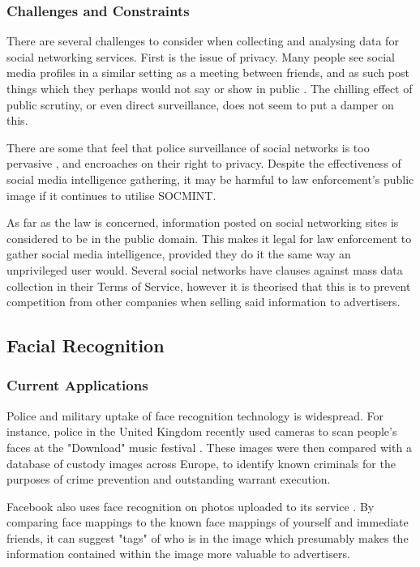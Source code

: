\documentclass{article}
\begin{document}
\subsubsection{Challenges and Constraints}
There are several challenges to consider when collecting and analysing data for social networking services. First is the issue of privacy. Many people see social media profiles in a similar setting as a meeting between friends, and as such post things which they perhaps would not say or show in public \citep{socialmediacontent}. The chilling effect of public scrutiny, or even direct surveillance, does not seem to put a damper on this.

There are some that feel that police surveillance of social networks is too pervasive \citep{socmintlawenforcement}, and encroaches on their right to privacy. Despite the effectiveness of social media intelligence gathering, it may be harmful to law enforcement's public image if it continues to utilise SOCMINT.

As far as the law is concerned, information posted on social networking sites is considered to be in the public domain. This makes it legal for law enforcement to gather social media intelligence, provided they do it the same way an unprivileged user would. Several social networks have clauses against mass data collection in their Terms of Service, however it is theorised that this is to prevent competition from other companies when selling said information to advertisers.

\subsection{Facial Recognition}
\subsubsection{Current Applications}
Police and military uptake of face recognition technology is widespread. For instance, police in the United Kingdom recently used cameras to scan people's faces at the "Download" music festival \citep{policefacerecog}. These images were then compared with a database of custody images across Europe, to identify known criminals for the purposes of crime prevention and outstanding warrant execution.

Facebook also uses face recognition on photos uploaded to its service \citep{facebookfacerecog}. By comparing face mappings to the known face mappings of yourself and immediate friends, it can suggest "tags" of who is in the image which presumably makes the information contained within the image more valuable to advertisers.
\end{document}

